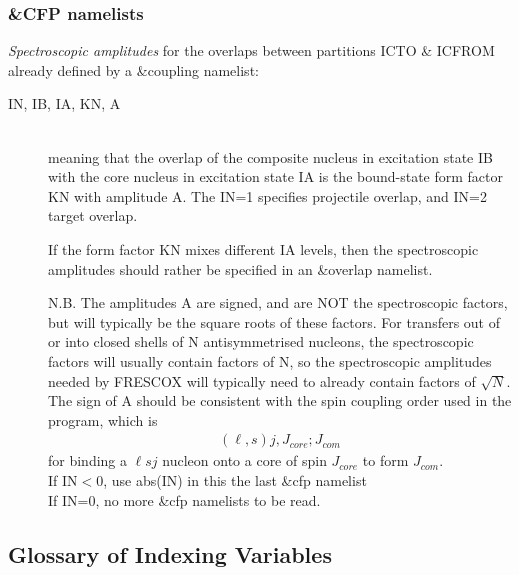 \documentclass[11pt]{article}
\newcommand{\beqn}{\begin{eqnarray}}
\newcommand{\eeqn}{\end{eqnarray}}
\begin{document}
\subsubsection{\&CFP namelists}
  {\em Spectroscopic amplitudes} {\rm for the overlaps between
partitions ICTO \& ICFROM already defined by a \&coupling namelist}:
\begin{description}
\item[IN, IB, IA, KN,  A] ~\\
%
meaning that the overlap of the composite nucleus in excitation
state IB with the core nucleus in excitation state IA is the
bound-state form factor KN with amplitude A. The IN=1 specifies
projectile overlap, and IN=2 target overlap.

 If the form factor KN mixes different IA levels, then the spectroscopic
 amplitudes should rather be specified in an \&overlap namelist.

N.B. The amplitudes A are signed, and are NOT the spectroscopic
factors, but will typically be the square roots of these factors.
For transfers out of or into closed shells of N antisymmetrised nucleons,
the spectroscopic factors will usually contain factors of N,
so the spectroscopic amplitudes needed by FRESCOX will typically 
need to already contain factors of $\sqrt{N}$.
\\
The sign of A should be consistent with the spin coupling order used in
the program, which is
\beqn
  (\ell,s)j, J_{core}; J_{com}
\eeqn
for binding a $\ell sj$ nucleon onto a core of spin $J_{core}$ to form $J_{com}$.
\\
 If IN$<$0, use abs(IN) in this the last \&cfp namelist\\
 If IN=0, no more \&cfp namelists to be read.
\end{description}

%
%

\subsection*{Glossary of Indexing Variables}
%
\end{document}
